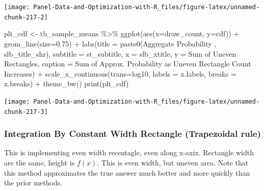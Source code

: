\documentclass[
]{book}
\newenvironment{Shaded}{\begin{snugshade}}{\end{snugshade}}
\newcommand{\AttributeTok}[1]{\textcolor[rgb]{0.77,0.63,0.00}{#1}}
\newcommand{\FloatTok}[1]{\textcolor[rgb]{0.00,0.00,0.81}{#1}}
\newcommand{\FunctionTok}[1]{\textcolor[rgb]{0.00,0.00,0.00}{#1}}
\newcommand{\NormalTok}[1]{#1}
\newcommand{\OtherTok}[1]{\textcolor[rgb]{0.56,0.35,0.01}{#1}}
\newcommand{\SpecialCharTok}[1]{\textcolor[rgb]{0.00,0.00,0.00}{#1}}
\newcommand{\StringTok}[1]{\textcolor[rgb]{0.31,0.60,0.02}{#1}}
\begin{document}
\begin{center}\texttt{[image: Panel-Data-and-Optimization-with-R\_files/figure-latex/unnamed-chunk-217-2]} \end{center}

\begin{Shaded}
\begin{Highlighting}[]
\NormalTok{plt\_cdf }\OtherTok{\textless{}{-}}\NormalTok{ tb\_sample\_means }\SpecialCharTok{\%\textgreater{}\%}
  \FunctionTok{ggplot}\NormalTok{(}\FunctionTok{aes}\NormalTok{(}\AttributeTok{x=}\NormalTok{draw\_count, }\AttributeTok{y=}\NormalTok{cdf)) }\SpecialCharTok{+}
  \FunctionTok{geom\_line}\NormalTok{(}\AttributeTok{size=}\FloatTok{0.75}\NormalTok{) }\SpecialCharTok{+}
  \FunctionTok{labs}\NormalTok{(}\AttributeTok{title =} \FunctionTok{paste0}\NormalTok{(}\StringTok{\textquotesingle{}Aggregate Probability \textquotesingle{}}\NormalTok{, slb\_title\_shr),}
       \AttributeTok{subtitle =}\NormalTok{ st\_subtitle,}
       \AttributeTok{x =}\NormalTok{ slb\_xtitle,}
       \AttributeTok{y =} \StringTok{\textquotesingle{}Sum of Uneven Rectangles\textquotesingle{}}\NormalTok{,}
       \AttributeTok{caption =} \StringTok{\textquotesingle{}Sum of Approx. Probability as Uneven Rectangle Count Increases\textquotesingle{}}\NormalTok{) }\SpecialCharTok{+}
  \FunctionTok{scale\_x\_continuous}\NormalTok{(}\AttributeTok{trans=}\StringTok{\textquotesingle{}log10\textquotesingle{}}\NormalTok{, }\AttributeTok{labels =}\NormalTok{ x.labels, }\AttributeTok{breaks =}\NormalTok{ x.breaks) }\SpecialCharTok{+}
  \FunctionTok{theme\_bw}\NormalTok{()}
\FunctionTok{print}\NormalTok{(plt\_cdf)}
\end{Highlighting}
\end{Shaded}

\begin{center}\texttt{[image: Panel-Data-and-Optimization-with-R\_files/figure-latex/unnamed-chunk-217-3]} \end{center}

\hypertarget{integration-by-constant-width-rectangle-trapezoidal-rule}{%
\subsubsection{Integration By Constant Width Rectangle (Trapezoidal rule)}\label{integration-by-constant-width-rectangle-trapezoidal-rule}}

This is implementing even width recentagle, even along x-axix. Rectangle width are the same, height is \(f(x)\). This is even width, but uneven area. Note that this method approximates the true answer much better and more quickly than the prior methods.
\end{document}
